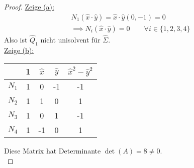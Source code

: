 \documentclass[12pt,a4paper]{article}
\begin{document}
\begin{proof}
\underline{Zeige (a):}\\
\begin{align*}
N_1(\hat{x}\cdot\hat{y})=\hat{x}\cdot\hat{y}(0,-1)=0\\
\implies N_i(\hat{x}\cdot\hat{y})=0\qquad\forall i\in\lbrace1,2,3,4\rbrace
\end{align*}
Also ist $\hat{Q}_1$ nicht unisolvent für $\hat{\Sigma}$.\\

\underline{Zeige (b):}\\
\begin{tabular}{c|cccc}
& 1 & $\hat{x}$ & $\hat{y}$ & $\hat{x}^2-\hat{y}^2$\\ \hline
$N_1$ & 1 & 0 & -1 & -1\\
$N_2$ & 1 & 1 & 0 & 1\\
$N_3$ & 1 & 0 & 1 & -1\\
$N_4$ & 1 & -1 & 0 & 1
\end{tabular}
Diese Matrix hat Determinante $\det(A)=8\neq0$.\\


\end{proof}
\end{document}
